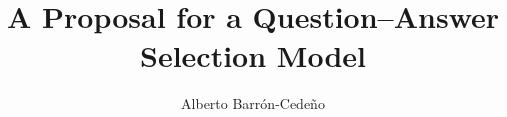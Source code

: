 \documentclass{sig-alternate-05-2015}
\begin{document}


%

\title{A Proposal for a Question--Answer Selection Model}

%
\author{Alberto Barr\'on-Cede\~no}
%


\maketitle
\begin{abstract}
\end{abstract}
\end{document}

